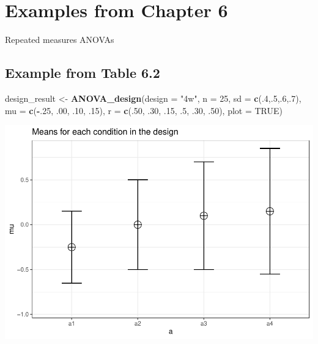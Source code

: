 \documentclass[]{book}
\newenvironment{Shaded}{\begin{snugshade}}{\end{snugshade}}
\newcommand{\DataTypeTok}[1]{\textcolor[rgb]{0.13,0.29,0.53}{#1}}
\newcommand{\DecValTok}[1]{\textcolor[rgb]{0.00,0.00,0.81}{#1}}
\newcommand{\FloatTok}[1]{\textcolor[rgb]{0.00,0.00,0.81}{#1}}
\newcommand{\KeywordTok}[1]{\textcolor[rgb]{0.13,0.29,0.53}{\textbf{#1}}}
\newcommand{\NormalTok}[1]{#1}
\newcommand{\OperatorTok}[1]{\textcolor[rgb]{0.81,0.36,0.00}{\textbf{#1}}}
\newcommand{\OtherTok}[1]{\textcolor[rgb]{0.56,0.35,0.01}{#1}}
\newcommand{\StringTok}[1]{\textcolor[rgb]{0.31,0.60,0.02}{#1}}
\begin{document}
\hypertarget{examples-from-chapter-6}{%
\section{Examples from Chapter 6}\label{examples-from-chapter-6}}

Repeated measures ANOVAs

\hypertarget{example-from-table-6.2}{%
\subsection{Example from Table 6.2}\label{example-from-table-6.2}}

\begin{Shaded}
\begin{Highlighting}[]
\NormalTok{design_result <-}\StringTok{ }\KeywordTok{ANOVA_design}\NormalTok{(}\DataTypeTok{design =} \StringTok{"4w"}\NormalTok{,}
                              \DataTypeTok{n =} \DecValTok{25}\NormalTok{,}
                              \DataTypeTok{sd =} \KeywordTok{c}\NormalTok{(.}\DecValTok{4}\NormalTok{,.}\DecValTok{5}\NormalTok{,.}\DecValTok{6}\NormalTok{,.}\DecValTok{7}\NormalTok{),}
                              \DataTypeTok{mu =} \KeywordTok{c}\NormalTok{(}\OperatorTok{-}\NormalTok{.}\DecValTok{25}\NormalTok{, }\FloatTok{.00}\NormalTok{, }\FloatTok{.10}\NormalTok{, }\FloatTok{.15}\NormalTok{),}
                              \DataTypeTok{r =} \KeywordTok{c}\NormalTok{(.}\DecValTok{50}\NormalTok{, }
                                    \FloatTok{.30}\NormalTok{,}
                                    \FloatTok{.15}\NormalTok{, }
                                    \FloatTok{.5}\NormalTok{,}
                                    \FloatTok{.30}\NormalTok{, }
                                    \FloatTok{.50}\NormalTok{),}
                              \DataTypeTok{plot =} \OtherTok{TRUE}\NormalTok{)}
\end{Highlighting}
\end{Shaded}

\includegraphics{SuperpowerValidation_files/figure-latex/aberson_6.2-1.pdf}
\end{document}
